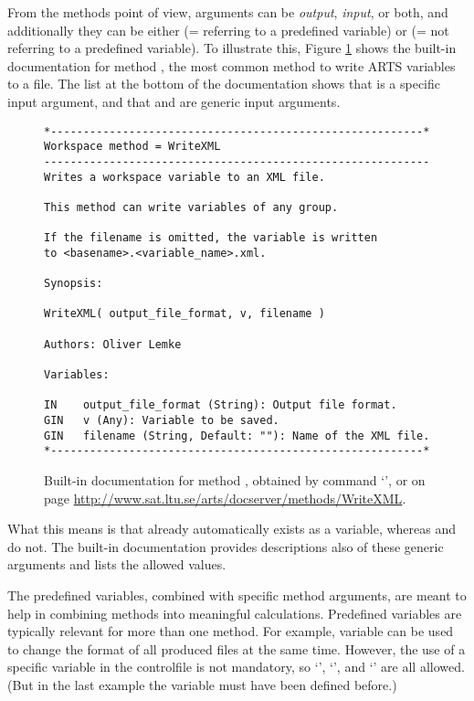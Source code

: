 From the methods point of view, arguments can be \emph{output},
\emph{input}, or both, and additionally they can be either
\emph{} (= referring to a predefined variable) or
\emph{} (= not referring to a predefined
variable). To illustrate this, Figure \ref{fig:WriteXML} shows the
built-in documentation for method , the most
common method to write ARTS variables to a file. The list at the
bottom of the documentation shows that
 is a specific input argument, and
that  and  are generic input
arguments.

\begin{figure}
\footnotesize
\begin{lstlisting}
*---------------------------------------------------------*
Workspace method = WriteXML
-----------------------------------------------------------
Writes a workspace variable to an XML file.

This method can write variables of any group.

If the filename is omitted, the variable is written
to <basename>.<variable_name>.xml.

Synopsis:

WriteXML( output_file_format, v, filename )

Authors: Oliver Lemke

Variables:

IN    output_file_format (String): Output file format.
GIN   v (Any): Variable to be saved.
GIN   filename (String, Default: ""): Name of the XML file.
*---------------------------------------------------------*
\end{lstlisting}
\caption{Built-in documentation for method , obtained by
  command `', or on page
  \url{http://www.sat.ltu.se/arts/docserver/methods/WriteXML}.}
\label{fig:WriteXML}
\end{figure}

What this means is that  already automatically
exists as a variable, whereas  and 
do not. The built-in documentation provides descriptions also of these generic
arguments and lists the allowed values.

The predefined variables, combined with specific method arguments, are meant to
help in combining methods into meaningful calculations. Predefined variables
are typically relevant for more than one method. For example, variable
 can be used to change the format of all produced
files at the same time. However, the use of a specific variable in the
controlfile is not mandatory, so `', `', and
`' are all allowed. (But in the
last example the variable  must have been defined before.)

